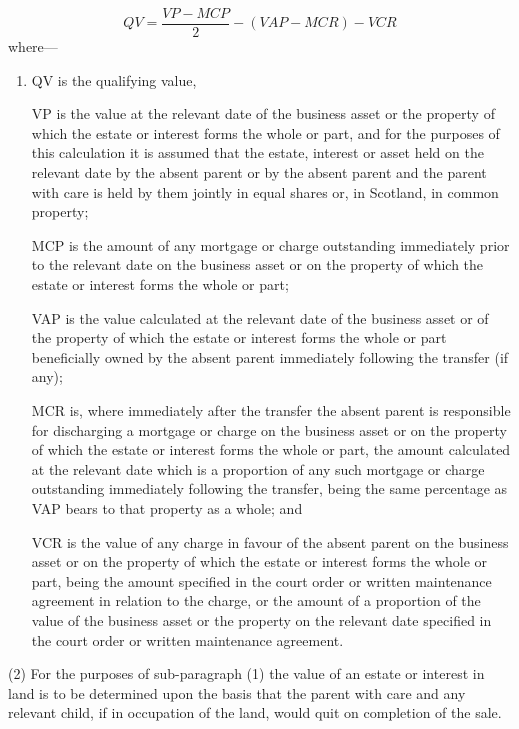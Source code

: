 \documentclass[12pt,a4paper]{article}
\begin{document}
\[QV = \frac{VP-MCP}{2} - (VAP-MCR) - VCR\]
where—
\begin{enumerate}\item[]
QV is the qualifying value,

VP is the value at the relevant date of the business asset or the property of which the estate or interest forms the whole or part,
and
for the purposes of this calculation it is assumed that the estate, interest or asset held on the relevant date by the absent parent or by the absent parent and the parent with care is held by them jointly in equal shares or, in Scotland, in common property;

MCP is the amount of any mortgage or charge outstanding immediately prior to the relevant date on the business asset or on the property of which the estate or interest forms the whole or part;

VAP is the value calculated at the relevant date of the business asset or of the property of which the estate or interest forms the whole or part beneficially owned by the absent parent immediately following the transfer (if any);

MCR is, where immediately after the transfer the absent parent is responsible for discharging a mortgage or charge on the business asset or on the property of which the estate or interest forms the whole or part, the amount calculated at the relevant date which is a proportion of any such mortgage or charge outstanding immediately following the transfer, being the same percentage as VAP bears to that property as a whole; and

VCR is the value of any charge in favour of the absent parent on the business asset or on the property of which the estate or interest forms the whole or part, being the amount specified in the court order or written maintenance agreement in relation to the charge, or the amount of a proportion of the value of the business asset or the property on the relevant date specified in the court order or written maintenance agreement.
\end{enumerate}

(2) For the purposes of sub-paragraph (1) the value of an estate or interest in land is to be determined upon the basis that the parent with care and any relevant child, if in occupation of the land, would quit on completion of the sale.

\end{document}
